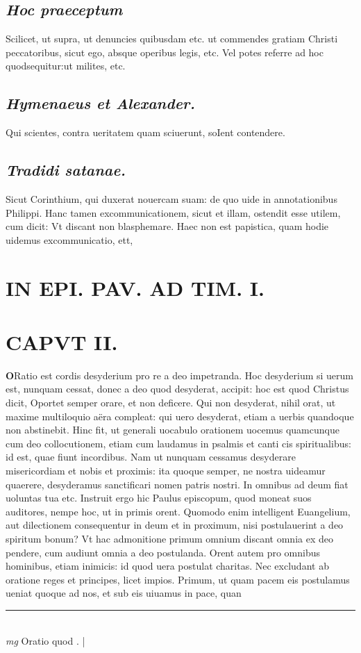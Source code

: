 \documentclass{article}
\begin{document}
\begin{pages}
\subsection*{\textit{Hoc praeceptum }}\pstart Scilicet, ut supra, ut denuncies quibusdam etc. ut commendes gratiam Christi peccatoribus, sicut ego, absque  operibus legis, etc. Vel potes referre ad hoc quodsequitur:ut milites, etc.  \pend
{}
{}
\subsection*{\textit{Hymenaeus et Alexander. }}\pstart Qui scientes, contra ueritatem quam sciuerunt, soIent contendere.  \pend
{}
{}
\subsection*{\textit{Tradidi satanae. }}\pstart Sicut Corinthium, qui duxerat nouercam suam: de quo uide in annotationibus Philippi. Hanc tamen excommunicationem, sicut et illam, ostendit esse utilem, cum dicit: Vt discant non blasphemare. Haec non est papistica, quam hodie uidemus excommunicatio, ett,  \pend
\section*{IN EPI. PAV. AD TIM. I. }
\marginpar{[ p.83 ]}
\endnumbering\beginnumbering\section{CAPVT II.}\pstart \huge\textbf{O}\normalsize Ratio est cordis desyderium pro re a deo impetranda. Hoc desyderium si uerum est, nunquam cessat, donec a deo quod desyderat, accipit: hoc est quod Christus dicit, Oportet semper orare, et non deficere. Qui non desyderat, nihil orat, ut maxime multiloquio aëra compleat: qui uero desyderat, etiam a uerbis quandoque  non abstinebit. Hinc fit, ut generali uocabulo orationem uocemus quamcunque  cum deo collocutionem, etiam cum laudamus in psalmis et canti cis spiritualibus: id est, quae fiunt incordibus. Nam ut nunquam cessamus desyderare misericordiam et nobis et proximis: ita quoque  semper, ne nostra uideamur quaerere, desyderamus sanctificari nomen patris nostri. In omnibus ad deum fiat uoluntas tua etc. Instruit ergo hic Paulus episcopum, quod moneat suos auditores, nempe hoc, ut in primis orent. Quomodo enim intelligent Euangelium, aut dilectionem consequentur in deum et in proximum, nisi postulauerint a deo spiritum bonum? Vt hac admonitione primum omnium discant omnia ex deo pendere, cum audiunt omnia a deo postulanda. Orent autem pro omnibus hominibus, etiam inimicis: id quod uera postulat charitas. Nec excludant ab oratione reges et principes, licet impios. Primum, ut quam pacem eis postulamus ueniat quoque  ad nos, et sub eis uiuamus in pace, quan\pend
\vspace{0.5cm}\noindent
\vspace{0.2cm}\rule{1cm}{0.2pt}\\ 
\hspace{0.2cm}\textit{mg}
\footnotesize Oratio quod . 
\normalsize| 

\end{pages}
\end{document}
